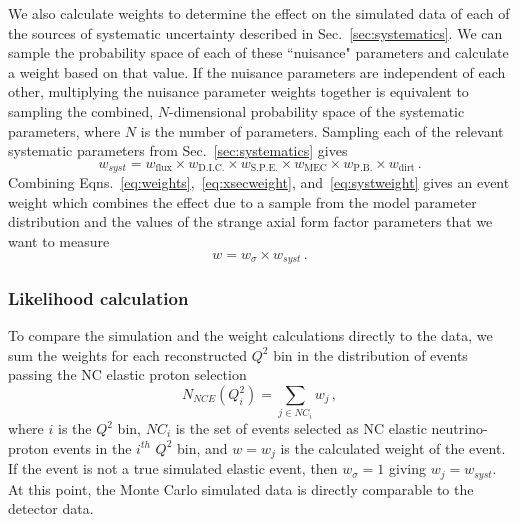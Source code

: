     We also calculate weights to determine the effect on the simulated data of
    each of the sources of systematic uncertainty described in
    Sec.~\ref{sec:systematics}.  We can sample the probability space of each of
    these ``nuisance" parameters and calculate a weight based on that value.
    If the nuisance parameters are independent of each other, multiplying the
    nuisance parameter weights together is equivalent to sampling the combined,
    $N$-dimensional probability space of the systematic parameters, where $N$
    is the number of parameters. Sampling each of the relevant systematic
    parameters from Sec.~\ref{sec:systematics} gives
    \begin{equation}\label{eq:systweight}
      w_{syst} = w_{\textrm{flux}} \times w_{\textrm{D.I.C.}}\times w_{\textrm{S.P.E.}}\times
                 w_{\textrm{MEC}} \times w_{\textrm{P.B.}} \times w_{\textrm{dirt}}\,.
    \end{equation}
    Combining Eqns.~\ref{eq:weights},~\ref{eq:xsecweight},
    and~\ref{eq:systweight} gives an event weight which combines the effect
    due to a sample from the model parameter distribution and the values of the
    strange axial form factor parameters that we want to measure
    \begin{equation}
      w = w_{\sigma}\times w_{syst} \,.
    \end{equation}

  \subsubsection{Likelihood calculation}\label{sec:likelihood}
    To compare the simulation and the weight calculations directly to the data,
    we sum the weights for each reconstructed $Q^2$ bin in the distribution of
    events passing the NC elastic proton selection
    \begin{equation}\label{eq:expected}
      N_{NCE}(Q^2_i) = \sum\limits_{j\in NC_i} w_j \,,
    \end{equation}
    where $i$ is the $Q^2$ bin, $NC_i$ is the set of events selected as NC
    elastic neutrino-proton events in the $i^{th}$ $Q^2$ bin, and $w = w_j$ is the
    calculated weight of the event. If the event is not a true simulated
    elastic event, then $w_\sigma = 1$ giving $w_j = w_{syst}$. At this point,
    the Monte Carlo simulated data is directly comparable to the detector data.

